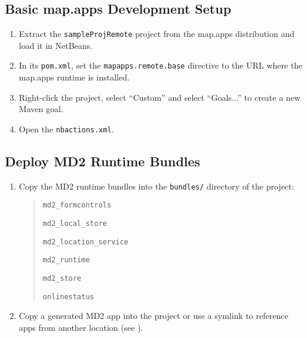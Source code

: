 
\subsection{Basic map.apps Development Setup} \label{subsec:basic-setup}

\begin{enumerate}
\item Extract the \texttt{sampleProjRemote} project from the map.apps distribution and load it in NetBeans. \label{item:extraction}
\item In its \texttt{pom.xml},
 set the \texttt{mapapps.remote.base} directive to the URL where the map.apps runtime is installed.
\item Right-click the project, select \enquote{Custom} and select \enquote{Goals...} to create a new Maven goal. 
\item Open the \texttt{nbactions.xml}. 

\end{enumerate}

\subsection{Deploy MD2 Runtime Bundles}
\begin{enumerate}
\item Copy the MD2 runtime bundles into the \texttt{bundles/} directory of the project:
	\begin{quotation}
		 \texttt{md2\_formcontrols}
		 
		 \texttt{md2\_local\_store}
		 
		 \texttt{md2\_location\_service}
		 
		 \texttt{md2\_runtime}
		 
		 \texttt{md2\_store}
		 
		 \texttt{onlinestatus}
	\end{quotation}

\item Copy a generated MD2 app into the project or use a symlink to reference apps from another location (see ).
\end{enumerate}